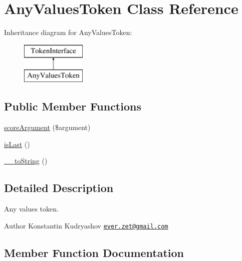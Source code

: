 \hypertarget{class_prophecy_1_1_argument_1_1_token_1_1_any_values_token}{}\section{Any\+Values\+Token Class Reference}
\label{class_prophecy_1_1_argument_1_1_token_1_1_any_values_token}
Inheritance diagram for Any\+Values\+Token\+:\begin{figure}[H]
\begin{center}
\leavevmode
\includegraphics[height=2.000000cm]{class_prophecy_1_1_argument_1_1_token_1_1_any_values_token}
\end{center}
\end{figure}
\subsection*{Public Member Functions}
\begin{DoxyCompactItemize}
\item 
\mbox{\hyperlink{class_prophecy_1_1_argument_1_1_token_1_1_any_values_token_a8d5bf47ab6eaa935458d5ad160e52822}{score\+Argument}} (\$argument)
\item 
\mbox{\hyperlink{class_prophecy_1_1_argument_1_1_token_1_1_any_values_token_ac72b8349b1340887fc1af30eca2b951c}{is\+Last}} ()
\item 
\mbox{\hyperlink{class_prophecy_1_1_argument_1_1_token_1_1_any_values_token_a7516ca30af0db3cdbf9a7739b48ce91d}{\+\_\+\+\_\+to\+String}} ()
\end{DoxyCompactItemize}


\subsection{Detailed Description}
Any values token.

\begin{DoxyAuthor}{Author}
Konstantin Kudryashov \href{mailto:ever.zet@gmail.com}{\tt ever.\+zet@gmail.\+com} 
\end{DoxyAuthor}


\subsection{Member Function Documentation}
\mbox{\label{class_prophecy_1_1_argument_1_1_token_1_1_any_values_token_a7516ca30af0db3cdbf9a7739b48ce91d}} 
